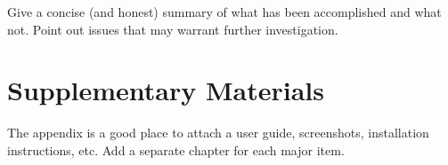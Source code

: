 \documentclass[english,notitlepage,smartquotes]{hgbreport}
\begin{document}
Give a concise (and honest) summary of what has been accomplished and what not. 
Point out issues that may warrant further investigation.

\appendix                                                   %

\chapter{Supplementary Materials}

The appendix is a good place to attach a user guide, screenshots, installation
instructions, etc. Add a separate chapter for each major item.

\MakeBibliography[nosplit]

\end{document}
